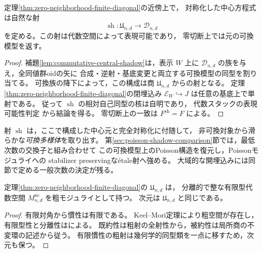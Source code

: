 \begin{proposition}[可換模型への表現可能な射]
\label{prop:representable-commutative-shadow}
定理\ref{thm:zero-neighborhood-finite-diagonal}の近傍上で，
対称化した中心方程式は自然な射
\[
 \operatorname{sh}:\mathfrak U_{n,d}\longrightarrow\mathcal D_{n,d}
\]
を定める。この射は代数空間によって表現可能であり，
零切断上では元の可換模型を返す。
\end{proposition}
\begin{proof}
補題\ref{lem:commutative-central-shadow}は，表示 $W$ 上に
$\mathcal D_{n,d}$ の族を与え，全同値群oidの矢に
合成・逆射・基底変更と両立する可換模型の同型を割り当てる。
可換族の降下によって，この構成は商 $\mathfrak U_{n,d}$ からの射となる。
定理\ref{thm:zero-neighborhood-finite-diagonal}の閉埋込み
$\mathcal E_W\hookrightarrow J$ は任意の基底上で単射である。
従って $\operatorname{sh}$ の相対自己同型の核は自明であり，
代数スタックの表現可能性判定
\cite[Lemma 101.6.2, Tag 04YY]{StacksProject}から結論を得る。
零切断上の一致は $F^{\mathrm{sh}}=F$ による。
\end{proof}

\begin{remark}
射 $\operatorname{sh}$ は，ここで構成した中心元と完全対称化に付随して，
非可換対象から滑らかな\emph{可換多様体}を取り出す。
第\ref{sec:poisson-shadow-comparison}節では，最低次数の交換子と組み合わせて
この可換模型上のPoisson構造を復元し，Poissonモジュライへの
stabilizer preservingな\'{e}tale射へ強める。
大域的な開埋込みには同節で定める一般次数の決定が残る。
\end{remark}

\begin{corollary}[零切断を含む分離的な粗モジュライ]
\label{cor:zero-neighborhood-separated-coarse}
定理\ref{thm:zero-neighborhood-finite-diagonal}の $\mathfrak U_{n,d}$ は，
分離的で整な有限型代数空間 $M^{\mathrm{nc}}_{n,d}$ を粗モジュライとして持つ。
次元は $\mathfrak U_{n,d}$ と同じである。
\end{corollary}
\begin{proof}
有限対角から慣性は有限である。
Keel--Mori定理\cite[Tag 0DUT]{StacksProject}により粗空間が存在し，
有限型性と分離性は\cite[Section 106.14, Tag 0DUW]{StacksProject}による。
既約性は粗射の全射性から，被約性は局所商の不変環の記述から従う。
有限慣性の粗射は幾何学的同型類を一点に移すため，次元も保つ。
\end{proof}

